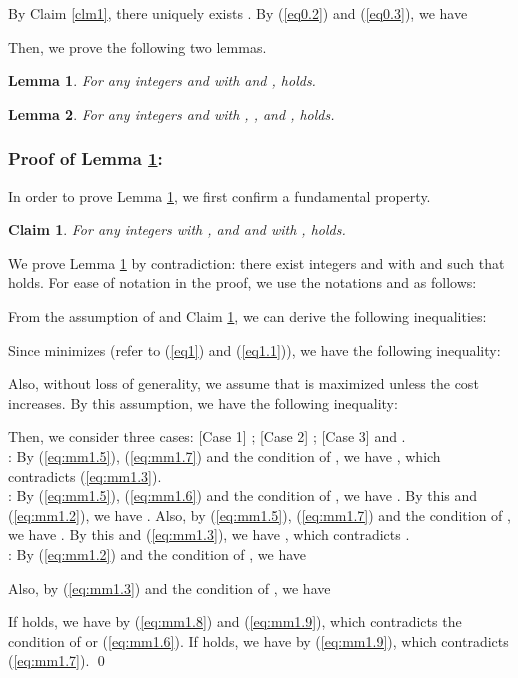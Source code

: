 \documentclass[a4paper]{llncs}
\newtheorem{lem}{Lemma}
\newtheorem{clm}{Claim}
\begin{document}
By Claim \ref{clm1}, there uniquely exists .
By (\ref{eq0.2}) and (\ref{eq0.3}), we have

Then, we prove the following two lemmas.
\begin{lem}
For any integers  and  with  and ,
 holds.
\label{lem1}
\end{lem}

\begin{lem}
For any integers  and  with , ,  and ,
 holds.
\label{lem2}
\end{lem}

\subsubsection{Proof of Lemma \ref{lem1}:}
In order to prove Lemma \ref{lem1}, we first confirm a fundamental property.
\begin{clm}
For any integers  with , and  and  with ,
 holds.
\label{clm:mm1.1}
\end{clm}
We prove Lemma \ref{lem1} by contradiction: 
there exist integers  and  with  and  such that
 holds.
For ease of notation in the proof, we use the notations  and  as follows:

From the assumption of  and Claim \ref{clm:mm1.1}, we can derive the following inequalities:

Since  minimizes  (refer to (\ref{eq1}) and (\ref{eq1.1})),
we have the following inequality:

Also, without loss of generality, we assume that  is maximized unless the cost increases. 
By this assumption, we have the following inequality:

Then, we consider three cases:
[Case 1] ; [Case 2] ; [Case 3]  and . \\
\noindent
[Case 1]: By (\ref{eq:mm1.5}), (\ref{eq:mm1.7}) and the condition of , we have , which contradicts (\ref{eq:mm1.3}).\\
\noindent
[Case 2]: By (\ref{eq:mm1.5}), (\ref{eq:mm1.6}) and the condition of , we have .
By this and (\ref{eq:mm1.2}), we have .
Also, by (\ref{eq:mm1.5}), (\ref{eq:mm1.7}) and the condition of , we have .
By this and (\ref{eq:mm1.3}), we have , which contradicts .\\
\noindent
[Case 3]: By (\ref{eq:mm1.2}) and the condition of , we have 

Also, by (\ref{eq:mm1.3}) and the condition of , we have

If  holds, we have  by (\ref{eq:mm1.8}) and (\ref{eq:mm1.9}), which contradicts the condition of  or (\ref{eq:mm1.6}).
If  holds, we have  by (\ref{eq:mm1.9}), which contradicts (\ref{eq:mm1.7}).
\qed
\end{document}

